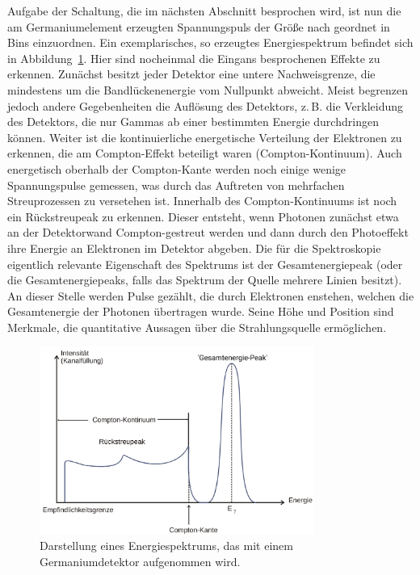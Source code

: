 Aufgabe der Schaltung, die im nächsten Abschnitt besprochen wird, ist nun die am Germaniumelement erzeugten Spannungspuls der 
Größe nach geordnet in Bins einzuordnen. Ein exemplarisches, so erzeugtes Energiespektrum befindet sich in 
Abbildung~\ref{fig: example_spectrum}. Hier sind nocheinmal die Eingans besprochenen Effekte zu erkennen. Zunächst besitzt jeder 
Detektor eine untere Nachweisgrenze, die mindestens um die Bandlückenenergie vom Nullpunkt abweicht. Meist begrenzen jedoch 
andere Gegebenheiten die Auflösung des Detektors, z.\,B. die Verkleidung des Detektors, die nur Gammas ab einer bestimmten Energie 
durchdringen können. Weiter ist die kontinuierliche energetische Verteilung der Elektronen zu erkennen, die am Compton-Effekt 
beteiligt waren (Compton-Kontinuum). Auch energetisch oberhalb der Compton-Kante werden noch einige wenige Spannungspulse gemessen,
was durch das Auftreten von mehrfachen Streuprozessen zu versetehen ist. Innerhalb des Compton-Kontinuums ist noch ein Rückstreupeak 
zu erkennen. Dieser entsteht, wenn Photonen zunächst etwa an der Detektorwand Compton-gestreut werden und dann durch den 
Photoeffekt ihre Energie an Elektronen im Detektor abgeben. 
Die für die Spektroskopie eigentlich relevante Eigenschaft des Spektrums ist der Gesamtenergiepeak (oder die Gesamtenergiepeaks, falls 
das Spektrum der Quelle mehrere Linien besitzt). An dieser Stelle werden Pulse gezählt, die durch Elektronen enstehen, welchen 
die Gesamtenergie der Photonen übertragen wurde.
Seine Höhe und Position sind Merkmale, die quantitative Aussagen über die Strahlungsquelle ermöglichen.   
\begin{figure}
\centering
\includegraphics[width = 0.8\textwidth]{pics/example_spectrum.pdf}
\caption{Darstellung eines Energiespektrums, das mit einem Germaniumdetektor aufgenommen wird.}
\label{fig: example_spectrum}
\end{figure}